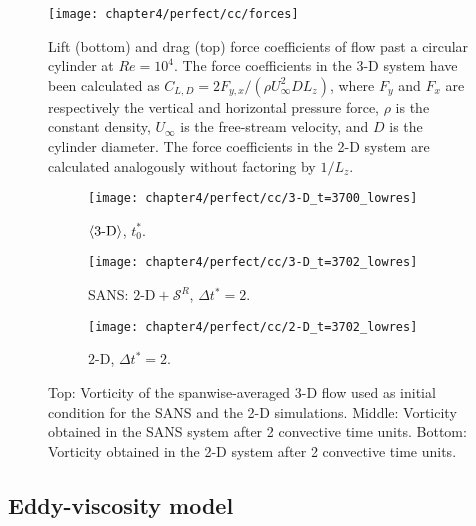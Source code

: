 \documentclass[../main.tex]{subfiles}
\begin{document}
\begin{figure}[!t]
\centering
\texttt{[image: chapter4/perfect/cc/forces]}
\caption{Lift (bottom) and drag (top) force coefficients of flow past a circular cylinder at $Re=10^4$.
The force coefficients in the 3-D system have been calculated as $C_{L,D}=2F_{y,x}/(\rho U_\infty^2 D L_z)$, where $F_y$ and $F_x$ are respectively the vertical and horizontal pressure force, $\rho$ is the constant density, $U_\infty$ is the free-stream velocity, and $D$ is the cylinder diameter.
The force coefficients in the 2-D system are calculated analogously without factoring by $1/L_z$.}
\label{fig:perfect_cc_forces}
\end{figure}

\begin{figure}[!t]
    \centering
    \begin{subfigure}[t]{0.7\linewidth}        
        \centering
        \texttt{[image: chapter4/perfect/cc/3-D\_t=3700\_lowres]}
        \caption{$\left\langle 3\text{-}\mathrm{D} \right\rangle$, $t^*_0$.}\vspace{0.4cm}
    \end{subfigure}
    \begin{subfigure}[t]{0.7\linewidth}
        \centering
        \texttt{[image: chapter4/perfect/cc/3-D\_t=3702\_lowres]}
        \caption{SANS: $2\text{-}\mathrm{D}+\mathcal{S}^{R}$, $\Delta t^*=2$.}\vspace{0.4cm}
    \end{subfigure}
    \begin{subfigure}[t]{0.7\linewidth}
        \centering
        \texttt{[image: chapter4/perfect/cc/2-D\_t=3702\_lowres]}
        \caption{$2\text{-}\mathrm{D}$, $\Delta t^*=2$.}
    \end{subfigure}
    \captionsetup[subfigure]{width=\linewidth}
    \caption{Top: Vorticity of the spanwise-averaged 3-D flow used as initial condition for the SANS and the 2-D simulations.
Middle: Vorticity obtained in the SANS system after 2 convective time units.
Bottom: Vorticity obtained in the 2-D system after 2 convective time units.}
\label{fig:perfect_cc_vort}
\end{figure}

\subsection{Eddy-viscosity model} \label{sec:evm}
\end{document}

